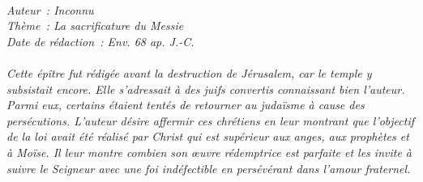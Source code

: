 \BFont
\noindent\hrulefill
{\footnotesize
\textit{
\bigskip
{\centering{}
\\Auteur~: Inconnu
\\Thème~: La sacrificature du Messie
\\Date de rédaction~: Env. 68 ap. J.-C.\\}
}
\textit{
\\Cette épître fut rédigée avant la destruction de Jérusalem, car le temple y subsistait encore. Elle s'adressait à des juifs convertis connaissant bien l'auteur. Parmi eux, certains étaient tentés de retourner au judaïsme à cause des persécutions. L'auteur désire affermir ces chrétiens en leur montrant que l'objectif de la loi avait été réalisé par Christ qui est supérieur aux anges, aux prophètes et à Moïse. Il leur montre combien son œuvre rédemptrice est parfaite et les invite à suivre le Seigneur avec une foi indéfectible en persévérant dans l'amour fraternel.\bigskip
}
}
\par\nobreak\noindent\hrulefill

